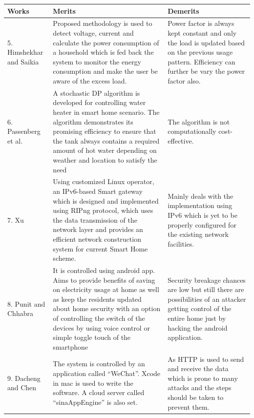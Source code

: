 \begin{table}[H]
\setlength{\tabcolsep}{2pt}
\begin{tabular}{| m{3cm} | m{4cm}| m{4cm} |}
\hline
\textbf{Works} & \textbf{Merits} & \textbf{Demerits} \\
\hline




 
 5. Himshekhar and Saikia \cite{14} & Proposed methodology is used to detect voltage, current and calculate the power consumption of a household which is fed back the system to monitor the energy consumption and make the user be aware of the excess load. & Power factor is always kept constant and only the load is updated based on the previous usage pattern. Efficiency can further be vary the power factor also.\\
\hline

6. Passenberg et al. \cite{15} & A stochastic DP algorithm is developed for controlling water heater in smart home scenario. The algorithm demonstrates its promising efficiency to ensure that the tank always contains a required amount of hot water depending on weather and location to satisfy the need & The algorithm is not computationally cost-effective.\\
\hline

7. Xu \cite{6} & Using customized Linux operator, an IPv6-based Smart gateway which is designed and implemented using RIPng protocol, which uses the data transmission of the network layer and provides an efficient network construction system for current Smart Home scheme. & Mainly deals with the implementation using IPv6 which is yet to be properly configured for the existing network facilities.\\
\hline

8. Punit and Chhabra \cite{5}  & It is controlled using android app. Aims to provide benefits of saving on electricity usage at home as well as keep the residents updated about home security with an option of controlling the switch of the devices by using voice control or simple toggle touch of the smartphone & Security breakage chances are low but still there are possibilities of an attacker getting control of the entire home just by hacking the android application. \\
\hline

9. Dacheng and Chen \cite{7} & The system is controlled by an application called “WeChat”. Xcode in mac is used to write the software. A cloud server called “sinaAppEngine” is also set. & As HTTP is used to send and receive the data which is prone to many attacks and the steps should be taken to prevent them.\\
\hline

\end{tabular}
\end{table}

